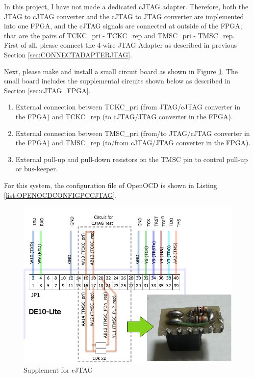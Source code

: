 In this project, I have not made a dedicated cJTAG adapter. Therefore, both the JTAG to cJTAG converter and the cJTAG to JTAG converter are implemented into one FPGA, and the cJTAG signals are connected at outside of the FPGA; that are the pairs of TCKC\_pri - TCKC\_rep and TMSC\_pri - TMSC\_rep.\\

First of all, please connect the 4-wire JTAG Adapter as described in previous Section \ref{sec:CONNECTADAPTERJTAG}. 

Next, please make and install a small circuit board as shown in Figure \ref{fig:USBCJTAGSUPPLEMENT}. The small board includes the supplemental circuits shown below as described in Section \ref{sec:cJTAG_FPGA}.

\begin{enumerate}
  \item External connection between TCKC\_pri (from JTAG/cJTAG converter in the FPGA) and TCKC\_rep (to cJTAG/JTAG converter in the FPGA).
  \item External connection between TMSC\_pri (from/to JTAG/cJTAG converter in the FPGA) and TMSC\_rep (to/from cJTAG/JTAG converter in the FPGA).
  \item External pull-up and pull-down resistors on the TMSC pin to control pull-up or bus-keeper.
\end{enumerate}

For this system, the configuration file of OpenOCD is shown in Listing \ref{list:OPENOCDCONFIGPCCJTAG}.

\begin{figure}[H]
    \includegraphics[width=1.0\columnwidth]{./Figure/USB_cJTAG_Supplement.png}
    \caption{Supplement for cJTAG}
    \label{fig:USBCJTAGSUPPLEMENT}
\end{figure}


